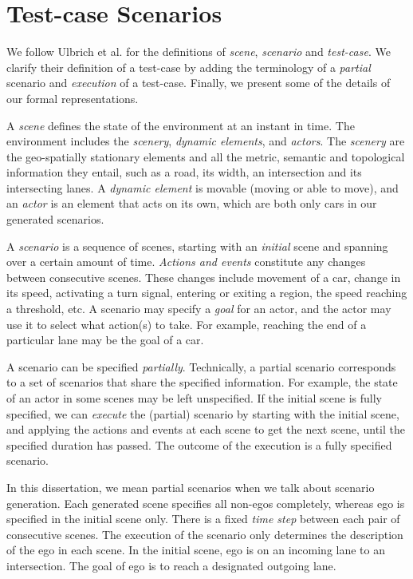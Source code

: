 \section{Test-case Scenarios}

We follow Ulbrich et al. \cite{Ulbrich.2015} for the definitions of \emph{scene}, \emph{scenario} and \emph{test-case}.
%
We clarify their definition of a test-case by adding the terminology of a \emph{partial} scenario and \emph{execution} of a test-case.
%
Finally, we present some of the details of our formal representations.

A \emph{scene} defines the state of the environment at an instant in time.
%
The environment includes the \emph{scenery}, \emph{dynamic elements}, and \emph{actors}.
%
The \emph{scenery} are the geo-spatially stationary elements and all the metric, semantic and topological information they entail, such as a road, its width, an intersection and its intersecting lanes.
%
A \emph{dynamic element} is movable (moving or able to move), and an \emph{actor} is an element that acts on its own, which are both only cars in our generated scenarios.

A \emph{scenario} is a sequence of scenes, starting with an \emph{initial} scene and  spanning over a certain amount of time.
%
\emph{Actions and events} constitute any changes between consecutive scenes.
%
These changes include movement of a car, change in its speed, activating a turn signal, entering or exiting a region, the speed reaching a threshold, etc.
%
A scenario may specify a \emph{goal} for an actor, and the actor may use it to select what action(s) to take.
%
For example, reaching the end of a particular lane may be the goal of a car.


A scenario can be specified \emph{partially}.
%
Technically, a partial scenario corresponds to a set of scenarios that share the specified information.
%
For example, the state of an actor in some scenes may be left unspecified.
%
If the initial scene is fully specified, we can \emph{execute} the (partial) scenario by starting with the initial scene, and applying the actions and events at each scene to get the next scene, until the specified duration has passed.
%
The outcome of the execution is a fully specified scenario.


In this dissertation, we mean partial scenarios when we talk about scenario generation.
%
Each generated scene specifies all non-egos completely, whereas ego is specified in the initial scene only.
%
There is a fixed \emph{time step} between each pair of consecutive scenes.
%
The execution of the scenario only determines the description of the ego in each scene.
%
In the initial scene, ego is on an incoming lane to an intersection.
%
The goal of ego is to reach a designated outgoing lane.
